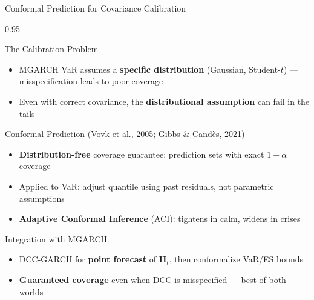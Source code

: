 \documentclass[9pt, aspectratio=169, t]{beamer}
\begin{document}
\begin{frame}{Conformal Prediction for Covariance Calibration}
    \begin{cminipage}{0.95\textwidth}
    \vspace{-1mm}
    {\footnotesize
    \begin{block}{The Calibration Problem}
        \begin{itemize}\setlength{\itemsep}{0pt}
            \item MGARCH VaR assumes a \textbf{specific distribution} (Gaussian, Student-$t$) --- misspecification leads to poor coverage
            \item Even with correct covariance, the \textbf{distributional assumption} can fail in the tails
        \end{itemize}
    \end{block}
    \begin{block}{Conformal Prediction (Vovk et al., 2005; Gibbs \& Cand\`es, 2021)}
        \begin{itemize}\setlength{\itemsep}{0pt}
            \item \textbf{Distribution-free} coverage guarantee: prediction sets with exact $1-\alpha$ coverage
            \item Applied to VaR: adjust quantile using past residuals, not parametric assumptions
            \item \textbf{Adaptive Conformal Inference} (ACI): tightens in calm, widens in crises
        \end{itemize}
    \end{block}
    \vspace{-1mm}
    \begin{alertblock}{Integration with MGARCH}
        \begin{itemize}\setlength{\itemsep}{0pt}
            \item DCC-GARCH for \textbf{point forecast} of $\mathbf{H}_t$, then conformalize VaR/ES bounds
            \item \textbf{Guaranteed coverage} even when DCC is misspecified --- best of both worlds
        \end{itemize}
    \end{alertblock}
    }
    \end{cminipage}
\end{frame}

\end{document}
